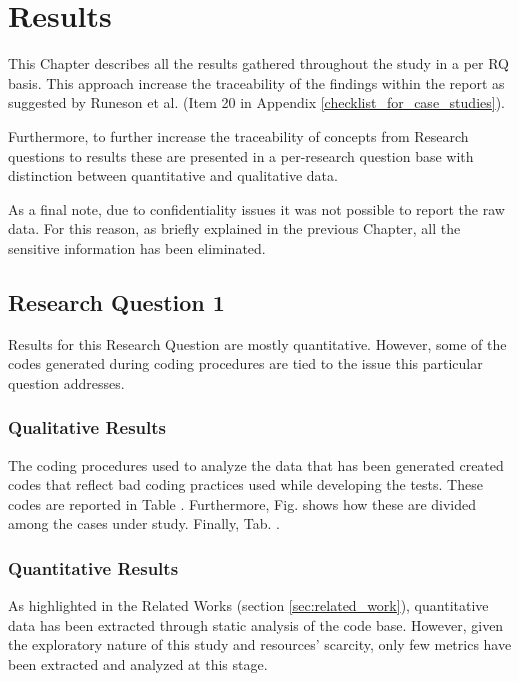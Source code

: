 \chapter{Results} \label{study_results}

This Chapter describes all the results gathered throughout the study in a per RQ basis. This approach increase the traceability of the findings within the report as suggested by Runeson et al. \cite{case_study_software_engineering} (Item 20 in Appendix \ref{checklist_for_case_studies}).

Furthermore, to further increase the traceability of concepts from Research questions to results these are presented in a per-research question base with distinction between quantitative and qualitative data.

As a final note, due to confidentiality issues it was not possible to report the raw data. For this reason, as briefly explained in the previous Chapter, all the sensitive information has been eliminated.

\section{Research Question 1}

Results for this Research Question are mostly quantitative. However, some of the codes generated during coding procedures are tied to the issue this particular question addresses.

\subsection{Qualitative Results}
    The coding procedures used to analyze the data that has been generated created codes that reflect bad coding practices used while developing the tests. These codes are reported in Table . Furthermore, Fig.  shows how these are divided among the cases under study. Finally, Tab. .
    

\subsection{Quantitative Results}

    As highlighted in the Related Works (section \ref{sec:related_work}), quantitative data has been extracted through static analysis of the code base. However, given the exploratory nature of this study and resources' scarcity, only few metrics have been extracted and analyzed at this stage.
    
